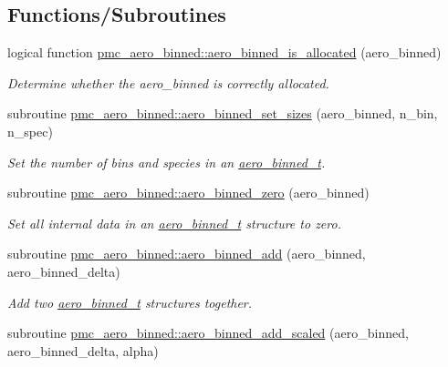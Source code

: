 \subsection*{Functions/\+Subroutines}
\begin{DoxyCompactItemize}
\item 
logical function \mbox{\hyperlink{namespacepmc__aero__binned_a3be8e75668295f81d711fb9e9c6e714b}{pmc\+\_\+aero\+\_\+binned\+::aero\+\_\+binned\+\_\+is\+\_\+allocated}} (aero\+\_\+binned)
\begin{DoxyCompactList}\small\item\em Determine whether the {\ttfamily aero\+\_\+binned} is correctly allocated. \end{DoxyCompactList}\item 
subroutine \mbox{\hyperlink{namespacepmc__aero__binned_a4ab330417b0d2db451b2965594f482ca}{pmc\+\_\+aero\+\_\+binned\+::aero\+\_\+binned\+\_\+set\+\_\+sizes}} (aero\+\_\+binned, n\+\_\+bin, n\+\_\+spec)
\begin{DoxyCompactList}\small\item\em Set the number of bins and species in an \mbox{\hyperlink{structpmc__aero__binned_1_1aero__binned__t}{aero\+\_\+binned\+\_\+t}}. \end{DoxyCompactList}\item 
subroutine \mbox{\hyperlink{namespacepmc__aero__binned_ab4a6f57e509928736c3e842154a04d76}{pmc\+\_\+aero\+\_\+binned\+::aero\+\_\+binned\+\_\+zero}} (aero\+\_\+binned)
\begin{DoxyCompactList}\small\item\em Set all internal data in an \mbox{\hyperlink{structpmc__aero__binned_1_1aero__binned__t}{aero\+\_\+binned\+\_\+t}} structure to zero. \end{DoxyCompactList}\item 
subroutine \mbox{\hyperlink{namespacepmc__aero__binned_a92f2ca0fca2bf061795d607f304fc5f6}{pmc\+\_\+aero\+\_\+binned\+::aero\+\_\+binned\+\_\+add}} (aero\+\_\+binned, aero\+\_\+binned\+\_\+delta)
\begin{DoxyCompactList}\small\item\em Add two \mbox{\hyperlink{structpmc__aero__binned_1_1aero__binned__t}{aero\+\_\+binned\+\_\+t}} structures together. \end{DoxyCompactList}\item 
subroutine \mbox{\hyperlink{namespacepmc__aero__binned_a96f6e3d8db17406af7c7a5594544821b}{pmc\+\_\+aero\+\_\+binned\+::aero\+\_\+binned\+\_\+add\+\_\+scaled}} (aero\+\_\+binned, aero\+\_\+binned\+\_\+delta, alpha)

\end{DoxyCompactItemize}
